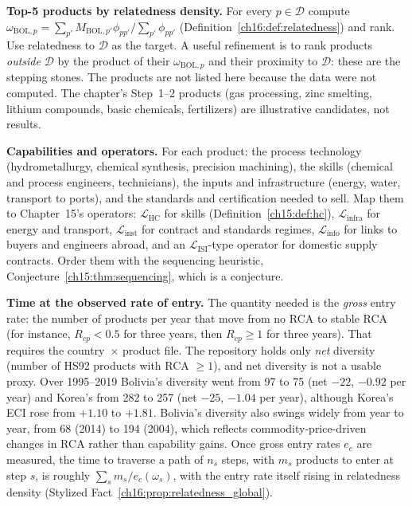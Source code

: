 \documentclass[../solutions_manual.tex]{subfiles}
\begin{document}
 \textbf{Top-5 products by relatedness density.} For every $p \in \mathcal{D}$ compute $\omega_{\text{BOL},p} = \sum_{p'} M_{\text{BOL},p'}\phi_{pp'}/\sum_{p'}\phi_{pp'}$ (Definition~\ref{ch16:def:relatedness}) and rank. Use relatedness to $\mathcal{D}$ as the target. A useful refinement is to rank products \emph{outside} $\mathcal{D}$ by the product of their $\omega_{\text{BOL},p}$ and their proximity to $\mathcal{D}$: these are the stepping stones. The products are not listed here because the data were not computed. The chapter's Step~1--2 products (gas processing, zinc smelting, lithium compounds, basic chemicals, fertilizers) are illustrative candidates, not results.

 \textbf{Capabilities and operators.} For each product: the process technology (hydrometallurgy, chemical synthesis, precision machining), the skills (chemical and process engineers, technicians), the inputs and infrastructure (energy, water, transport to ports), and the standards and certification needed to sell. Map them to Chapter~15's operators: $\mathcal{L}_{\text{HC}}$ for skills (Definition~\ref{ch15:def:hc}), $\mathcal{L}_{\text{infra}}$ for energy and transport, $\mathcal{L}_{\text{inst}}$ for contract and standards regimes, $\mathcal{L}_{\text{info}}$ for links to buyers and engineers abroad, and an $\mathcal{L}_{\text{ISI}}$-type operator for domestic supply contracts. Order them with the sequencing heuristic, Conjecture~\ref{ch15:thm:sequencing}, which is a conjecture.

 \textbf{Time at the observed rate of entry.} The quantity needed is the \emph{gross} entry rate: the number of products per year that move from no RCA to stable RCA (for instance, $R_{cp} < 0.5$ for three years, then $R_{cp} \ge 1$ for three years). That requires the country~$\times$ product file. The repository holds only \emph{net} diversity (number of HS92 products with RCA $\ge 1$), and net diversity is not a usable proxy. Over 1995--2019 Bolivia's diversity went from 97 to 75 (net $-22$, $-0.92$ per year) and Korea's from 282 to 257 (net $-25$, $-1.04$ per year), although Korea's ECI rose from $+1.10$ to $+1.81$. Bolivia's diversity also swings widely from year to year, from 68 (2014) to 194 (2004), which reflects commodity-price-driven changes in RCA rather than capability gains. Once gross entry rates $e_c$ are measured, the time to traverse a path of $n_s$ steps, with $m_s$ products to enter at step $s$, is roughly $\sum_s m_s/e_c(\omega_s)$, with the entry rate itself rising in relatedness density (Stylized Fact~\ref{ch16:prop:relatedness_global}).
\end{document}
